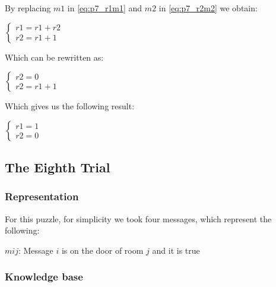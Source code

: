By replacing $m1$ in \ref{eq:p7_r1m1} and $m2$ in \ref{eq:p7_r2m2} we obtain:

\begin{center}
\begin{math}
\begin{cases}
  r1 = r1 + r2\\
  r2 = r1 + 1
\end{cases}
\end{math} 
\end{center}

Which can be rewritten as: 

\begin{center}
\begin{math}
\begin{cases}
  r2 = 0\\
 r2 = r1 + 1
\end{cases}
\end{math} 
\end{center}


Which gives us the following result:

\begin{center}
\begin{math}
\begin{cases}
 r1 = 1\\
 r2 = 0
\end{cases}
\end{math} 
\end{center}








\subsection{The Eighth Trial}

\subsubsection{Representation}

For this puzzle, for simplicity we took four messages, which represent the following:

\begin{center}

\item $mij$: Message $i$ is on the door of room $j$ and it is true
 
\end{center}

\subsubsection{Knowledge base}

